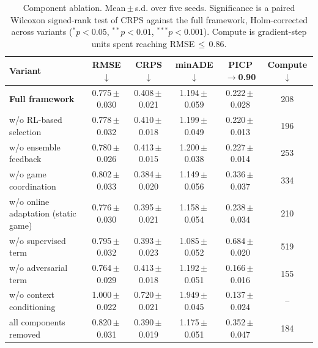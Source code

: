 \begin{table}[!t]
\centering
\caption{Component ablation. Mean\,$\pm$\,s.d. over five seeds. Significance is a paired Wilcoxon signed-rank test of CRPS against the full framework, Holm-corrected across variants ($^{\ast}p<0.05$, $^{\ast\ast}p<0.01$, $^{\ast\ast\ast}p<0.001$). Compute is gradient-step units spent reaching RMSE\,$\leq$\,0.86.}
\label{tab:ablation}
\begin{tabular}{lccccc}
\toprule
Variant & RMSE $\downarrow$ & CRPS $\downarrow$ & minADE $\downarrow$ & PICP $\rightarrow$0.90 & Compute $\downarrow$ \\
\midrule
\textbf{Full framework} & 0.775\,$\pm$\,0.030 & 0.408\,$\pm$\,0.021 & 1.194\,$\pm$\,0.059 & 0.222\,$\pm$\,0.028 & 208 \\
w/o RL-based selection & 0.778\,$\pm$\,0.032 & 0.410\,$\pm$\,0.018 & 1.199\,$\pm$\,0.049 & 0.220\,$\pm$\,0.013 & 196 \\
w/o ensemble feedback & 0.780\,$\pm$\,0.026 & 0.413\,$\pm$\,0.015 & 1.200\,$\pm$\,0.038 & 0.227\,$\pm$\,0.014 & 253 \\
w/o game coordination & 0.802\,$\pm$\,0.033 & 0.384\,$\pm$\,0.020 & 1.149\,$\pm$\,0.056 & 0.336\,$\pm$\,0.037 & 334 \\
w/o online adaptation (static game) & 0.776\,$\pm$\,0.030 & 0.395\,$\pm$\,0.021 & 1.158\,$\pm$\,0.054 & 0.238\,$\pm$\,0.034 & 210 \\
w/o supervised term & 0.795\,$\pm$\,0.032 & 0.393\,$\pm$\,0.023 & 1.085\,$\pm$\,0.052 & 0.684\,$\pm$\,0.020 & 519 \\
w/o adversarial term & 0.764\,$\pm$\,0.029 & 0.413\,$\pm$\,0.018 & 1.192\,$\pm$\,0.051 & 0.166\,$\pm$\,0.016 & 155 \\
w/o context conditioning & 1.000\,$\pm$\,0.022 & 0.720\,$\pm$\,0.021 & 1.949\,$\pm$\,0.045 & 0.137\,$\pm$\,0.024 & -- \\
all components removed & 0.820\,$\pm$\,0.031 & 0.390\,$\pm$\,0.019 & 1.175\,$\pm$\,0.051 & 0.352\,$\pm$\,0.047 & 184 \\
\bottomrule
\end{tabular}
\end{table}
